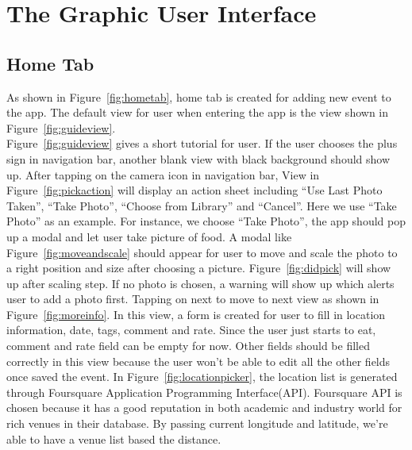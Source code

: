 \chapter{The Graphic User Interface} %
\label{cha:the_graphic_user_interface}

\section{Home Tab} %
\label{sec:tabs}
	As shown in Figure~\ref{fig:hometab}, home tab is created for adding new event to the app. The default view for user when entering the app is the view shown in Figure~\ref{fig:guideview}. \\
	
	Figure~\ref{fig:guideview} gives a short tutorial for user. If the user chooses the plus sign in navigation bar, another blank view with black background should show up. After tapping on the camera icon in navigation bar, View in Figure~\ref{fig:pickaction} will display an action sheet including ``Use Last Photo Taken'', ``Take Photo'', ``Choose from Library'' and ``Cancel''. Here we use ``Take Photo'' as an example. For instance, we choose ``Take Photo'', the app should pop up a modal and let user take picture of food. A modal like Figure~\ref{fig:moveandscale} should appear for user to move and scale the photo to a right position and size after choosing a picture. Figure~\ref{fig:didpick} will show up after scaling step. If no photo is chosen, a warning will show up which alerts user to add a photo first. Tapping on next to move to next view as shown in Figure~\ref{fig:moreinfo}. In this view, a form is created for user to fill in location information, date, tags, comment and rate. Since the user just starts to eat, comment and 
rate field can be empty for now. Other fields should be filled correctly in this view because the user won't be able to edit all the other fields once saved the event. In Figure~\ref{fig:locationpicker}, the location list is generated through Foursquare Application Programming Interface(API). Foursquare API is chosen  because it has a good reputation in both academic and industry world for rich venues in their database. By passing current longitude and latitude, we're able to have a venue list based the distance.

